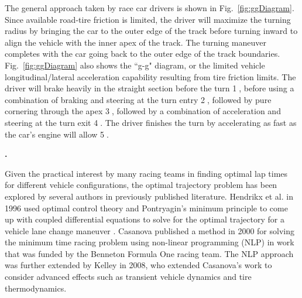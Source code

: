 \documentclass[10pt,a4paper]{article}
\def\section#1{\refstepcounter{section} \vspace{3.5mm} \noindent
{\normalsize\bf {\thesection.}} \hspace{0.5mm}{\normalsize\bf #1} \par \vspace{2mm}}
\begin{document}
The general approach taken by race car drivers is shown in Fig.~\ref{fig:ggDiagram}. Since available road-tire friction is limited, the driver will maximize the turning radius
by bringing the car to the outer edge of the track before turning inward to align the vehicle with the inner apex of the track. 
The turning maneuver completes with the car going back to the outer edge of the track boundaries. Fig.~\ref{fig:ggDiagram} also shows the ``g-g" diagram, or the limited vehicle longitudinal/lateral
acceleration capability resulting from tire friction limits. The driver will brake heavily in the straight section before the turn \textcircled{1}, before using a combination of braking and steering
at the turn entry \textcircled{2}, followed by pure cornering through the apex \textcircled{3}, followed by a combination of acceleration and steering at the turn exit \textcircled{4}. The driver finishes the turn by accelerating as fast
as the car's engine will allow \textcircled{5}.

  
 
\section{PRIOR WORK}
\label{sec:controller}

Given the practical interest by many racing teams in finding optimal lap times for different vehicle configurations, the optimal trajectory problem has been explored by several authors in
previously published literature. Hendrikx et al. in 1996 used optimal control theory and Pontryagin's minimum principle to come up with coupled differential equations to solve for the optimal trajectory
for a vehicle lane change maneuver \cite{hendrikx}. Casanova \cite{casanova} published a method  in 2000 for solving the minimum time racing problem using non-linear programming (NLP) in work
that was funded by the Benneton Formula One racing team. The NLP approach was further extended by Kelley \cite{kelly} in 2008, who extended Casanova's work to consider advanced effects such as transient 
vehicle dynamics and tire thermodynamics. 
\end{document}

